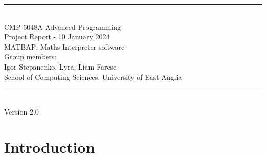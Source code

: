 \documentclass[a4paper, oneside, 11pt]{report}
\begin{document}
\begin{titlepage}
\begin{center}
\rule{12cm}{1mm} \\
\vspace{1cm}
{\large  CMP-6048A Advanced Programming}
\vspace{7.5cm}
\\{\Large Project Report - 10 January 2024}
\vspace{1.5cm}
\\{\LARGE MATBAP: Maths Interpreter software}
\vspace{1.0cm}
\\{\Large Group members: \\ Igor Stepanenko, Lyra, Liam Farese\ }
\vspace{10.0cm}
\\{\large School of Computing Sciences, University of East Anglia}
\\ \rule{12cm}{0.5mm}
\\ \hspace{8.5cm} {\large Version 2.0}
\end{center}
\end{titlepage}


\setcounter{page}{1}


\begin{abstract}
Please replace this section with your own abstract. An abstract is a brief summary (maximum 250 words) of your entire project. It should cover your objectives, your methodologies used, a brief developmental history, your final results, in particular covering the optional tasks, and a discussion and conclusion. You do not cover the literature or background in an abstract nor should you use abbreviations or acronyms. The remainder of this report template has clear chapter titles and we suggest to stick to these although you can organise your material inside each chapter to your own preferences. A guideline in size is approximately 3,500 words (not including abstract, captions and references) but no real limit on figures, tables, diagrams, pseudo-code etc.
\end{abstract}

\chapter{Introduction}
\label{chap:intro}
\end{document}
